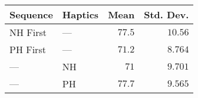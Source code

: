\begin{tabular}{llrr}
\toprule
 Sequence & Haptics &   Mean &  Std. Dev. \\
\midrule
 NH First &     --- & $77.5$ &    $10.56$ \\
 PH First &     --- & $71.2$ &    $8.764$ \\
      --- &      NH &   $71$ &    $9.701$ \\
      --- &      PH & $77.7$ &    $9.565$ \\
\bottomrule
\end{tabular}
